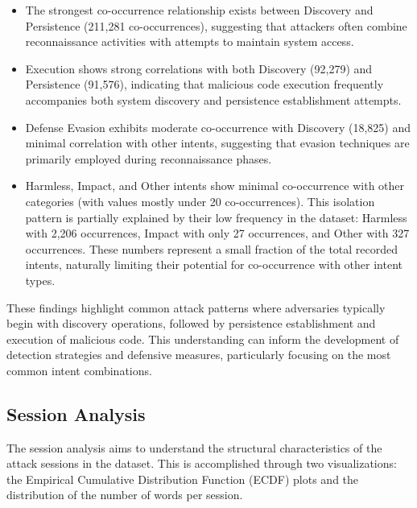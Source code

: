         \begin{itemize}
        
            \item The strongest co-occurrence relationship exists between Discovery and Persistence (211,281 co-occurrences), suggesting that attackers often combine reconnaissance activities with attempts to maintain system access.

            \item Execution shows strong correlations with both Discovery (92,279) and Persistence (91,576), indicating that malicious code execution frequently accompanies both system discovery and persistence establishment attempts.

            \item Defense Evasion exhibits moderate co-occurrence with Discovery (18,825) and minimal correlation with other intents, suggesting that evasion techniques are primarily employed during reconnaissance phases.

            \item Harmless, Impact, and Other intents show minimal co-occurrence with other categories (with values mostly under 20 co-occurrences). This isolation pattern is partially explained by their low frequency in the dataset: Harmless with 2,206 occurrences, Impact with only 27 occurrences, and Other with 327 occurrences. These numbers represent a small fraction of the total recorded intents, naturally limiting their potential for co-occurrence with other intent types.
            
        \end{itemize}

        These findings highlight common attack patterns where adversaries typically begin with discovery operations, followed by persistence establishment and execution of malicious code. This understanding can inform the development of detection strategies and defensive measures, particularly focusing on the most common intent combinations.
        
    \subsection{Session Analysis}

        The session analysis aims to understand the structural characteristics of the attack sessions in the dataset. This is accomplished through two visualizations: the Empirical Cumulative Distribution Function (ECDF) plots and the distribution of the number of words per session.


